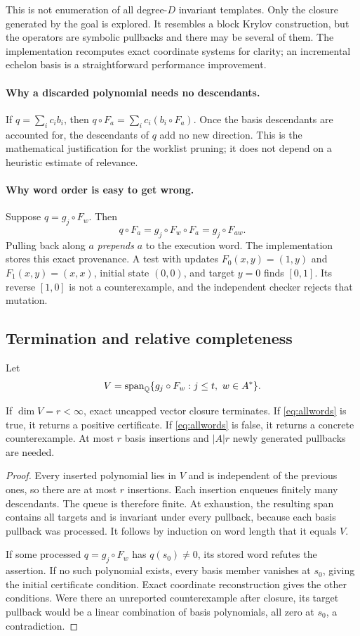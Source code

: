 This is not enumeration of all degree-$D$ invariant templates. Only the closure generated by the goal is explored. It resembles a block Krylov construction, but the operators are symbolic pullbacks and there may be several of them. The implementation recomputes exact coordinate systems for clarity; an incremental echelon basis is a straightforward performance improvement.

\paragraph{Why a discarded polynomial needs no descendants.}
If $q=\sum_i c_i b_i$, then $q\circ F_a=\sum_i c_i(b_i\circ F_a)$. Once the basis descendants are accounted for, the descendants of $q$ add no new direction. This is the mathematical justification for the worklist pruning; it does not depend on a heuristic estimate of relevance.

\paragraph{Why word order is easy to get wrong.}
Suppose $q=g_j\circ F_w$. Then
\[
 q\circ F_a=g_j\circ F_w\circ F_a=g_j\circ F_{aw}.
\]
Pulling back along $a$ \emph{prepends} $a$ to the execution word. The implementation stores this exact provenance. A test with updates $F_0(x,y)=(1,y)$ and $F_1(x,y)=(x,x)$, initial state $(0,0)$, and target $y=0$ finds $[0,1]$. Its reverse $[1,0]$ is not a counterexample, and the independent checker rejects that mutation.

\subsection{Termination and relative completeness}

Let
\[
 V=\Span_\Q\{g_j\circ F_w:j\le t,\ w\in A^*\}.
\]

\begin{theorem}
If $\dim V=r<\infty$, exact uncapped vector closure terminates. If \eqref{eq:allwords} is true, it returns a positive certificate. If \eqref{eq:allwords} is false, it returns a concrete counterexample. At most $r$ basis insertions and $|A|r$ newly generated pullbacks are needed.
\end{theorem}
\begin{proof}
Every inserted polynomial lies in $V$ and is independent of the previous ones, so there are at most $r$ insertions. Each insertion enqueues finitely many descendants. The queue is therefore finite. At exhaustion, the resulting span contains all targets and is invariant under every pullback, because each basis pullback was processed. It follows by induction on word length that it equals $V$.

If some processed $q=g_j\circ F_w$ has $q(s_0)\ne0$, its stored word refutes the assertion. If no such polynomial exists, every basis member vanishes at $s_0$, giving the initial certificate condition. Exact coordinate reconstruction gives the other conditions. Were there an unreported counterexample after closure, its target pullback would be a linear combination of basis polynomials, all zero at $s_0$, a contradiction.
\end{proof}

